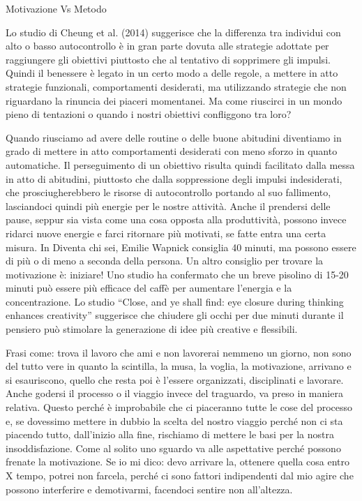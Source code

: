 \documentclass[12pt]{book} %
\begin{document}
\begin{mdframed}[linewidth=1pt]
Motivazione Vs Metodo

Lo studio di Cheung et al. (2014) suggerisce che la differenza tra individui con alto o basso autocontrollo è in gran parte dovuta alle strategie adottate per raggiungere gli obiettivi piuttosto che al tentativo di sopprimere gli impulsi. Quindi il benessere è legato in un certo modo a delle regole, a mettere in atto strategie funzionali,
comportamenti desiderati, ma utilizzando strategie che non riguardano la rinuncia dei piaceri momentanei. Ma come
riuscirci in un mondo pieno di tentazioni o quando i nostri obiettivi confliggono tra loro? 

Quando riusciamo ad avere delle routine o delle buone abitudini diventiamo in grado di mettere in atto comportamenti
desiderati con meno sforzo in quanto automatiche. Il perseguimento di un obiettivo risulta quindi facilitato
dalla messa in atto di abitudini, piuttosto che dalla soppressione degli impulsi indesiderati, che prosciugherebbero le
risorse di autocontrollo portando al suo fallimento, lasciandoci quindi più energie per le nostre
attività. Anche il prendersi delle pause, seppur
sia vista come una cosa opposta alla produttività, possono invece ridarci nuove energie e farci ritornare più motivati,
se fatte entra una certa misura. In Diventa chi sei, Emilie Wapnick
consiglia 40 minuti, ma possono essere di più o di meno a seconda della persona. Un altro consiglio per trovare la
motivazione è: iniziare!
Uno studio ha confermato che un breve pisolino di 15-20 minuti può essere più efficace del caffè per aumentare l’energia e la concentrazione.
Lo studio “Close, and ye shall find: eye closure during thinking enhances creativity” suggerisce che chiudere gli occhi per due minuti durante il pensiero può stimolare la generazione di idee più creative e flessibili.

Frasi come: trova il lavoro che ami e non lavorerai nemmeno un giorno, non sono del tutto vere in quanto la scintilla,
la musa, la voglia, la motivazione, arrivano e si esauriscono, quello che resta poi è l'essere organizzati,
disciplinati e lavorare. Anche godersi il processo o il viaggio invece del traguardo, va preso in maniera relativa.
Questo perché è improbabile che ci piaceranno tutte le cose del processo e, se dovessimo mettere in dubbio la scelta
del nostro viaggio perché non ci sta piacendo tutto, dall'inizio alla fine, rischiamo di mettere le basi per la nostra insoddisfazione. Come al solito uno sguardo va alle aspettative perché possono frenate la
motivazione. Se io mi dico: devo arrivare la, ottenere quella cosa entro X tempo, potrei non farcela, perché ci sono
fattori indipendenti dal mio agire che possono interferire e demotivarmi, facendoci sentire non all'altezza.


\end{mdframed}
\end{document}
